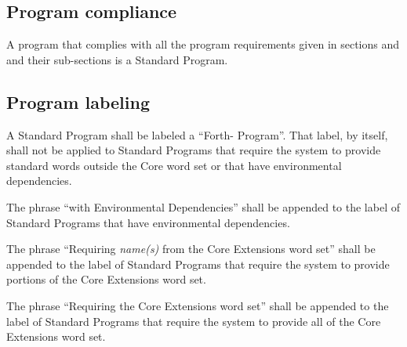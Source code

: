 \subsection{Program compliance} %

A program that complies with all the program requirements given in
sections  and  and their sub-sections is
a Standard Program.

\subsection{Program labeling} %

A Standard Program shall be labeled a ``Forth-\snapshot{} Program''. That
label, by itself, shall not be applied to Standard Programs that
require the system to provide standard words outside the Core word
set or that have environmental dependencies.

The phrase ``with Environmental Dependencies'' shall be appended to
the label of Standard Programs that have environmental dependencies.

The phrase ``Requiring \emph{name(s)} from the Core Extensions word
set'' shall be appended to the label of Standard Programs that
require the system to provide portions of the Core Extensions word
set.

The phrase ``Requiring the Core Extensions word set'' shall be
appended to the label of Standard Programs that require the system
to provide all of the Core Extensions word set.
